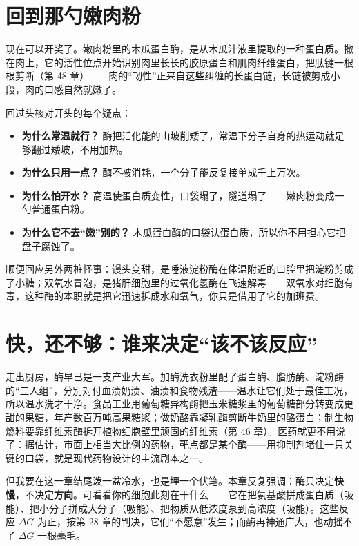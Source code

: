 \section{回到那勺嫩肉粉}

现在可以开奖了。嫩肉粉里的木瓜蛋白酶，是从木瓜汁液里提取的一种蛋白质。撒在肉上，它的活性位点开始识别肉里长长的胶原蛋白和肌肉纤维蛋白，把肽键一根根剪断（第 48 章）——肉的“韧性”正来自这些纠缠的长蛋白链，长链被剪成小段，肉的口感自然就嫩了。

回过头核对开头的每个疑点：

\begin{itemize}[itemsep=2pt]
\item \textbf{为什么常温就行？} 酶把活化能的山坡削矮了，常温下分子自身的热运动就足够翻过矮坡，不用加热。
\item \textbf{为什么只用一点？} 酶不被消耗，一个分子能反复接单成千上万次。
\item \textbf{为什么怕开水？} 高温使蛋白质变性，口袋塌了，隧道塌了——嫩肉粉变成一勺普通蛋白粉。
\item \textbf{为什么它不去“嫩”别的？} 木瓜蛋白酶的口袋认蛋白质，所以你不用担心它把盘子腐蚀了。
\end{itemize}

顺便回应另外两桩怪事：馒头变甜，是唾液淀粉酶在体温附近的口腔里把淀粉剪成了小糖；双氧水冒泡，是猪肝细胞里的过氧化氢酶在飞速解毒——双氧水对细胞有毒，这种酶的本职就是把它迅速拆成水和氧气，你只是借用了它的加班费。

\section{快，还不够：谁来决定“该不该反应”}

走出厨房，酶早已是一支产业大军。加酶洗衣粉里配了蛋白酶、脂肪酶、淀粉酶的“三人组”，分别对付血渍奶渍、油渍和食物残渣——温水让它们处于最佳工况，所以温水洗才干净。食品工业用葡萄糖异构酶把玉米糖浆里的葡萄糖部分转变成更甜的果糖，年产数百万吨高果糖浆；做奶酪靠凝乳酶剪断牛奶里的酪蛋白；制生物燃料要靠纤维素酶拆开植物细胞壁里顽固的纤维素（第 46 章）。医药就更不用说了：据估计，市面上相当大比例的药物，靶点都是某个酶——用抑制剂堵住一只关键的口袋，就是现代药物设计的主流剧本之一。

但我要在这一章结尾泼一盆冷水，也是埋一个伏笔。本章反复强调：酶只决定\textbf{快慢}，不决定\textbf{方向}。可看看你的细胞此刻在干什么——它在把氨基酸拼成蛋白质（吸能）、把小分子拼成大分子（吸能）、把物质从低浓度泵到高浓度（吸能）。这些反应 $\Delta G$ 为正，按第 28 章的判决，它们“不愿意”发生；而酶再神通广大，也动摇不了 $\Delta G$ 一根毫毛。

